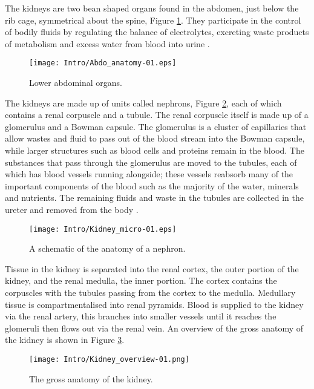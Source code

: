 The kidneys are two bean shaped organs found in the abdomen, just below the rib cage, symmetrical about the spine, Figure \ref{fig:intro_abdo}. They participate in the control of bodily fluids by regulating the balance of electrolytes, excreting waste products of metabolism and excess water from blood into urine \cite{lote_principles_2012}. 

\begin{figure}[H]
	\centering
	\texttt{[image: Intro/Abdo\_anatomy-01.eps]}
	\caption{Lower abdominal organs.}
	\label{fig:intro_abdo}	
\end{figure}

The kidneys are made up of units called nephrons, Figure \ref{fig:intro_nephron}, each of which contains a renal corpuscle and a tubule. The renal corpuscle itself is made up of a glomerulus and a Bowman capsule. The glomerulus is a cluster of capillaries that allow wastes and fluid to pass out of the blood stream into the Bowman capsule, while larger structures such as blood cells and proteins remain in the blood. The substances that pass through the glomerulus are moved to the tubules, each of which has blood vessels running alongside; these vessels reabsorb many of the important components of the blood such as the majority of the water, minerals and nutrients. The remaining fluids and waste in the tubules are collected in the ureter and removed from the body \cite{hall_guyton_2015}. 

\begin{figure}[H]
	\centering
	\texttt{[image: Intro/Kidney\_micro-01.eps]}
	\caption{A schematic of the anatomy of a nephron.}
	\label{fig:intro_nephron}	
\end{figure}

Tissue in the kidney is separated into the renal cortex, the outer portion of the kidney, and the renal medulla, the inner portion. The cortex contains the corpuscles with the tubules passing from the cortex to the medulla. Medullary tissue is compartmentalised into renal pyramids. Blood is supplied to the kidney via the renal artery, this branches into smaller vessels until it reaches the glomeruli then flows out via the renal vein. An overview of the gross anatomy of the kidney is shown in Figure \ref{fig:intro_kidney_overview}.

\begin{figure}[H]
	\centering
	\texttt{[image: Intro/Kidney\_overview-01.png]}
	\caption{The gross anatomy of the kidney.}
	\label{fig:intro_kidney_overview}	
\end{figure}

